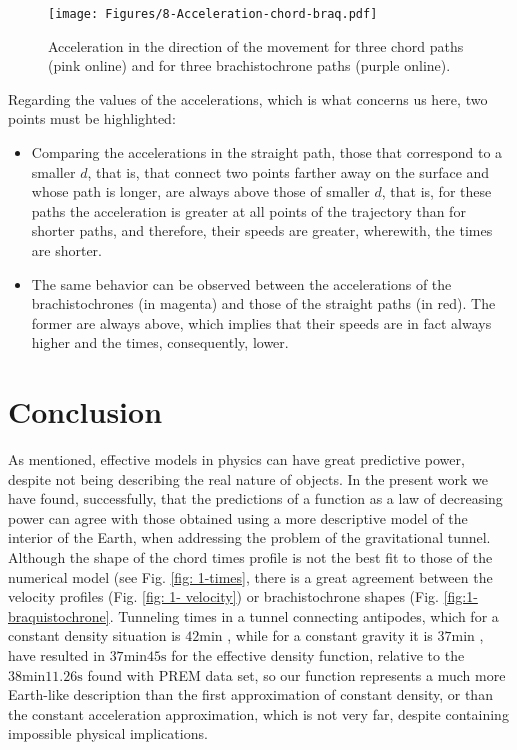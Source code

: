 \documentclass[aps,twocolumn,showpacs,preprintnumbers]{revtex4}
\begin{document}
    \begin{figure}
        \centering
        \texttt{[image: Figures/8-Acceleration-chord-braq.pdf]}
        \caption{Acceleration in the direction of the movement for three chord paths (pink online) and for three brachistochrone  paths (purple online).}
        \label{fig: 1-a-chord and a-braq}
    \end{figure}
    
    Regarding the values of the accelerations, which is what concerns us here, two points must be highlighted:
        
    \begin{itemize}
        \item Comparing the accelerations in the straight path, those that correspond to a smaller $ d $, that is, that connect two points farther away on the surface and whose path is longer, are always above those of smaller $ d $, that is, for these paths the acceleration is greater at all points of the trajectory than for shorter paths, and therefore, their speeds are greater, wherewith, the times are shorter.
        \item The same behavior can be observed between the accelerations of the brachistochrones (in magenta) and those of the straight paths (in red). The former are always above, which implies that their speeds are in fact always higher and the times, consequently, lower.
    \end{itemize}
    
    \newline



\section{Conclusion}

    As mentioned, effective models in physics can have great predictive power, despite not being describing the real nature of objects. In the present work we have found, successfully, that the predictions of a function as a law of decreasing power can agree with those obtained using a more descriptive model of the interior of the Earth, when addressing the problem of the gravitational tunnel. Although the shape of the chord times profile is not the best fit to those of the numerical model (see Fig. \ref{fig: 1-times}, there is a great agreement between the velocity profiles (Fig. \ref{fig: 1- velocity}) or brachistochrone shapes (Fig. \ref{fig:1-braquistochrone}. Tunneling times in a tunnel connecting antipodes, which for a constant density situation is $ 42 \text{min} $ \cite{Venezian}, while for a constant gravity it is $ 37 \text{min} $ \citep{ gravity-train-prem}, have resulted in $ 37 \text{min} 45 \text {s} $ for the effective density function, relative to the $ 38 \text{min} 11.26 \text{s} $ found with PREM data set, so our function represents a much more Earth-like description than the first approximation of constant density, or than the constant acceleration approximation, which is not very far, despite containing impossible physical implications.
    
\end{document}

